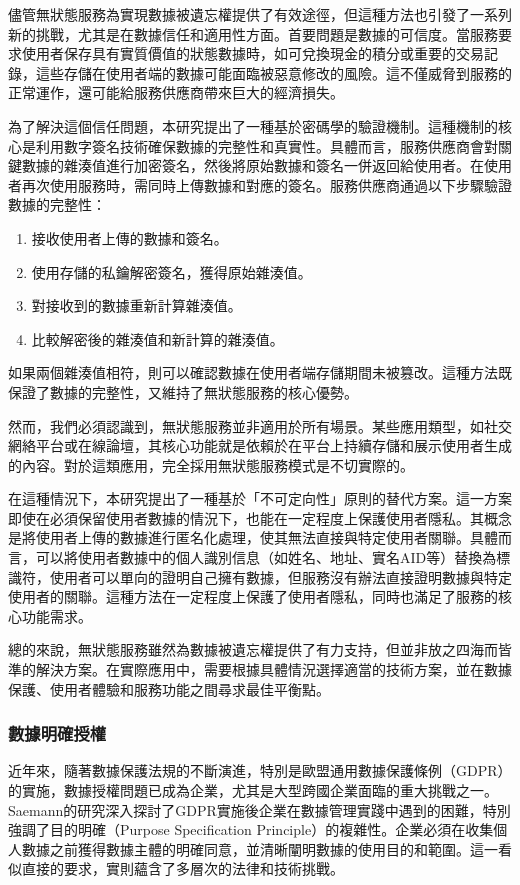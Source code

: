 儘管無狀態服務為實現數據被遺忘權提供了有效途徑，但這種方法也引發了一系列新的挑戰，尤其是在數據信任和適用性方面。首要問題是數據的可信度。當服務要求使用者保存具有實質價值的狀態數據時，如可兌換現金的積分或重要的交易記錄，這些存儲在使用者端的數據可能面臨被惡意修改的風險。這不僅威脅到服務的正常運作，還可能給服務供應商帶來巨大的經濟損失。

為了解決這個信任問題，本研究提出了一種基於密碼學的驗證機制。這種機制的核心是利用數字簽名技術確保數據的完整性和真實性。具體而言，服務供應商會對關鍵數據的雜湊值進行加密簽名，然後將原始數據和簽名一併返回給使用者。在使用者再次使用服務時，需同時上傳數據和對應的簽名。服務供應商通過以下步驟驗證數據的完整性：
\begin{enumerate}
  \item 接收使用者上傳的數據和簽名。
  \item 使用存儲的私鑰解密簽名，獲得原始雜湊值。
  \item 對接收到的數據重新計算雜湊值。
  \item 比較解密後的雜湊值和新計算的雜湊值。
\end{enumerate}
如果兩個雜湊值相符，則可以確認數據在使用者端存儲期間未被篡改。這種方法既保證了數據的完整性，又維持了無狀態服務的核心優勢。

然而，我們必須認識到，無狀態服務並非適用於所有場景。某些應用類型，如社交網絡平台或在線論壇，其核心功能就是依賴於在平台上持續存儲和展示使用者生成的內容。對於這類應用，完全採用無狀態服務模式是不切實際的。

在這種情況下，本研究提出了一種基於「不可定向性」原則的替代方案。這一方案即使在必須保留使用者數據的情況下，也能在一定程度上保護使用者隱私。其概念是將使用者上傳的數據進行匿名化處理，使其無法直接與特定使用者關聯。具體而言，可以將使用者數據中的個人識別信息（如姓名、地址、實名AID等）替換為標識符，使用者可以單向的證明自己擁有數據，但服務沒有辦法直接證明數據與特定使用者的關聯。這種方法在一定程度上保護了使用者隱私，同時也滿足了服務的核心功能需求。

總的來說，無狀態服務雖然為數據被遺忘權提供了有力支持，但並非放之四海而皆準的解決方案。在實際應用中，需要根據具體情況選擇適當的技術方案，並在數據保護、使用者體驗和服務功能之間尋求最佳平衡點。
\subsubsection{數據明確授權}
近年來，隨著數據保護法規的不斷演進，特別是歐盟通用數據保護條例（GDPR）的實施，數據授權問題已成為企業，尤其是大型跨國企業面臨的重大挑戰之一。Saemann\cite{saemann2022investigating}的研究深入探討了GDPR實施後企業在數據管理實踐中遇到的困難，特別強調了目的明確（Purpose Specification Principle）的複雜性。企業必須在收集個人數據之前獲得數據主體的明確同意，並清晰闡明數據的使用目的和範圍。這一看似直接的要求，實則蘊含了多層次的法律和技術挑戰。

